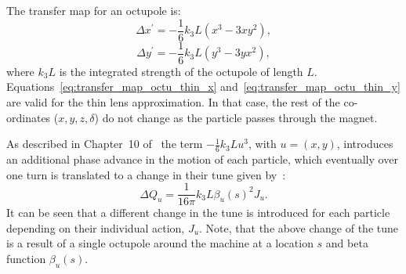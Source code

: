 The transfer map for an octupole is:
\begin{equation}\label{eq:transfer_map_octu_thin_x}
   \Delta x^\prime = -\frac{1}{6}{k_3L}(x^3-3xy^2),
\end{equation}
\begin{equation}\label{eq:transfer_map_octu_thin_y}
    \Delta y^\prime= -\frac{1}{6}{k_3L}(y^3-3yx^2),
 \end{equation}
 where $k_3L$ is the integrated strength of the octupole of length $L$. Equations~\eqref{eq:transfer_map_octu_thin_x} and~\eqref{eq:transfer_map_octu_thin_y} are valid for the thin lens approximation. %
 In that case, the rest of the co-ordinates ($x,y,z,\delta$) do not change as the particle passes through the magnet.


As described in Chapter~10 of~\cite{Stoel:2693915} the term $-\frac{1}{6}k_3Lu^3$, with $u=(x,y)$, introduces an additional phase advance in the motion of each particle, which eventually over one turn is translated to a change in their tune given by~\cite{Stoel:2693915}:
\begin{equation}\label{eq:tune_shit_octupoles}
    \Delta Q_u  = \frac{1}{16 \pi} k_3L\beta_u(s)^2 J_u .
\end{equation}
It can be seen that a different change in the tune is introduced for each particle depending on their individual action, $J_u$. Note, that the above change of the tune is a result of a single octupole around the machine at a location $s$ and beta function $\beta_u(s)$. %


